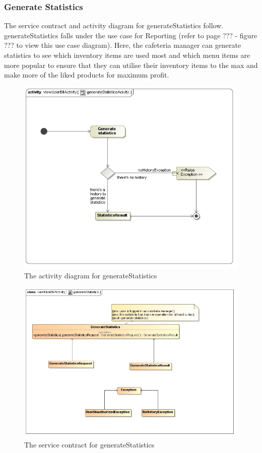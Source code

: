 \documentclass[a4paper,12pt]{report}
\begin{document}
\subsubsection{Generate Statistics }
The service contract and activity diagram for generateStatistics follow. generateStatistics falls under the use case for Reporting (refer to page ??? - figure ??? to view this use case diagram). Here, the cafeteria manager can generate statistics to see which inventory items are used most and which menu items are more popular to ensure that they can utilise their inventory items to the max and make more of the liked products for maximum profit.
\begin{figure}[H]
  \centering
    \includegraphics[width=1.0\textwidth]{../images/generateStatisticsAcivity.jpg}
    \caption{The activity diagram for generateStatistics} 
\end{figure}
\begin{figure}[H]
  \centering
    \includegraphics[width=1.0\textwidth]{../images/generateStatistics.jpg}
    \caption{The service contract for generateStatistics} 
\end{figure}
\end{document}

